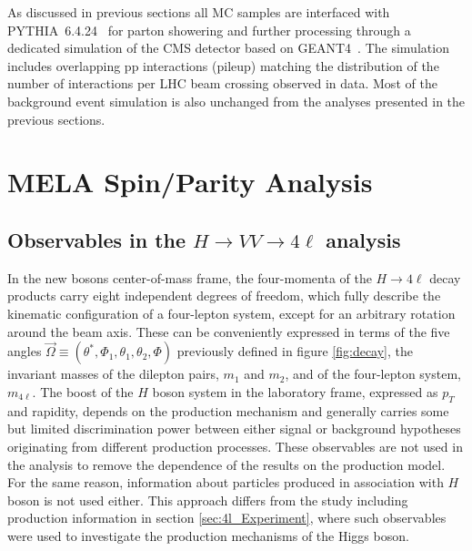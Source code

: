 As discussed in previous sections all MC samples are interfaced with \\ \textsc{PYTHIA}~6.4.24~\cite{Sjostrand:2006za} for parton showering and further processing through a dedicated simulation of the CMS detector based on \textsc{GEANT4}~\cite{Agostinelli2003250}. The simulation includes overlapping pp interactions (pileup) matching the distribution of the number of interactions per LHC beam crossing observed in data. Most of the background event simulation is also unchanged from the analyses presented in the previous sections.


\section{MELA Spin/Parity Analysis}
\label{sec:MELA_SpinParity}

\subsection{Observables in the \texorpdfstring{$H \to VV \to 4\ell$}{H to VV to 4l} analysis}
\label{sec:Observables_spinparity}

In the new bosons center-of-mass frame, the four-momenta of the $H \to 4\ell$ decay products carry eight independent degrees of freedom,
which fully describe the kinematic configuration of a four-lepton system, except for an arbitrary
rotation around the beam axis. These can be conveniently expressed in terms of the five angles
$\vec\Omega\equiv(\theta^*, \Phi_1, \theta_1, \theta_2, \Phi)$ previously defined in figure \ref{fig:decay}, the invariant masses of the dilepton pairs, $m_{1}$ and $m_2$, and of the four-lepton system, $m_{4\ell}$.
The boost of the $H$ boson system in the laboratory frame, expressed as $p_{T}$ and rapidity, depends on the production
mechanism and generally carries some but limited discrimination power between either signal or background
hypotheses originating from different production processes. These observables are not used in the analysis
to remove the dependence of the results on the production model. For the same reason, information about particles
produced in association with $H$ boson is not used either. This approach differs from the study including production information in section \ref{sec:4l_Experiment}, where such observables were used to investigate the production mechanisms of the Higgs boson.

